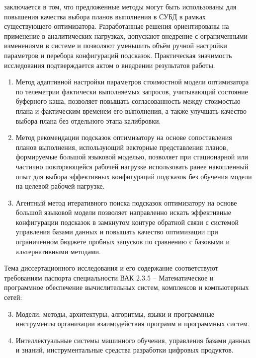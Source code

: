 {\influence} заключается в том, что предложенные методы могут быть использованы для повышения качества выбора планов выполнения в СУБД в рамках существующего оптимизатора. Разработанные решения ориентированы на применение в аналитических нагрузках, допускают внедрение с ограниченными изменениями в системе и позволяют уменьшить объём ручной настройки параметров и перебора конфигураций подсказок. Практическая значимость исследования подтверждается актом о внедрении результатов работы.

{}
\begin{enumerate}[beginpenalty=10000] %
\item Метод адаптивной настройки параметров стоимостной модели оптимизатора по телеметрии фактически выполняемых запросов, учитывающий состояние буферного кэша, позволяет повышать согласованность между стоимостью плана и фактическим временем его выполнения, а также улучшать качество выбора плана без отдельного этапа калибровки.

\item Метод рекомендации подсказок оптимизатору на основе сопоставления планов выполнения, использующий векторные представления планов, формируемые большой языковой моделью, позволяет при стационарной или частично повторяющейся рабочей нагрузке использовать ранее накопленный опыт для выбора эффективных конфигураций подсказок без обучения модели на целевой рабочей нагрузке.

\item Агентный метод итеративного поиска подсказок оптимизатору на основе большой языковой модели позволяет направленно искать эффективные конфигурации подсказок в замкнутом контуре обратной связи с системой управления базами данных и повышать качество оптимизации при ограниченном бюджете пробных запусков по сравнению с базовыми и альтернативными методами.
\end{enumerate}

{\pasport} Тема диссертационного исследования и его содержание соответствуют требованиям паспорта специальности ВАК 2.3.5 – Математическое и программное обеспечение вычислительных систем, комплексов и компьютерных сетей:
\begin{enumerate}
    \setcounter{enumi}{2}
    \item Модели, методы, архитектуры, алгоритмы, языки и программные инструменты организации взаимодействия программ и программных систем.
    \item Интеллектуальные системы машинного обучения, управления базами данных и знаний, инструментальные средства разработки цифровых продуктов. 
\end{enumerate}

